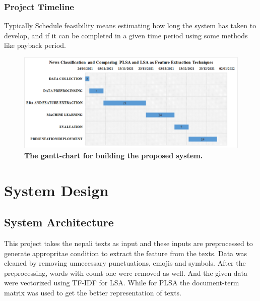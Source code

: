 \documentclass[12pt]{report}
\begin{document}
        \subsection{Project Timeline}
        Typically Schedule feasibility means estimating how long the system has taken to develop, and if
it can be completed in a given time period using some methods like payback period.
                \begin{figure}[h!]
                    \includegraphics[scale=0.45]{gantt1.png}
                    \caption{\textbf{The gantt-chart for building the proposed system.}}
                \end{figure}
          
        \newpage
        \chapter{System Design}
        \section{System Architecture}
                This project takes the nepali texts as input and these inputs are preprocessed to generate appropritae condition to extract 
                the feature from the texts.
                Data was cleaned by removing unnecessary punctuations, emojis and symbols. After the preprocessing, words with count one were removed as well. And the given data were vectorized using TF-IDF for LSA.
                While for PLSA the document-term matrix was used to get the better representation of texts.
\end{document}
